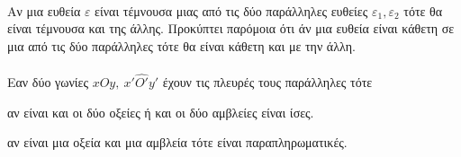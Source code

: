 \documentclass[twoside,nofonts,ektypwsh,shmeiwseis]{thewria}
\begin{document}
\mbox{}\\
Αν μια ευθεία $ \varepsilon $ είναι τέμνουσα μιας από τις δύο παράλληλες ευθείες $ \varepsilon_1,\varepsilon_2 $ τότε θα είναι τέμνουσα και της άλλης. Προκύπτει παρόμοια ότι άν μια ευθεία είναι κάθετη σε μια από τις δύο παράλληλες τότε θα είναι κάθετη και με την άλλη.\\\\
Εαν δύο γωνίες $ x\hat{O}y,\ x'\hat{O'}y' $ έχουν τις πλευρές τους παράλληλες τότε
\begin{rlist}
\item αν είναι και οι δύο οξείες ή και οι δύο αμβλείες είναι ίσες.
\item αν είναι μια οξεία και μια αμβλεία τότε είναι παραπληρωματικές.
\end{rlist}
\end{document}
